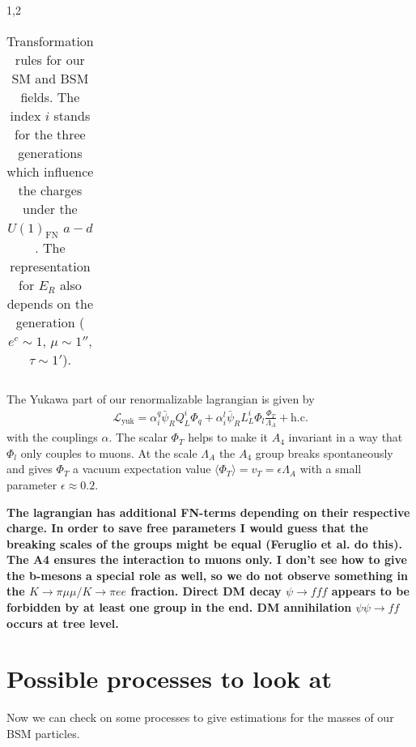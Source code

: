 \documentclass[11pt,a4paper,twoside]{article}
\begin{document}
\begin{spacing}{1,2}
\begin{table}
\begin{tabular}{c|c|c|c}
 \end{tabular}
\caption{Transformation rules for our SM and BSM fields. The index $i$ stands for the three generations which influence the charges under the 
$U(1)_\text{FN}$ $a-d$. The representation for $E_R$ also depends on the generation ($e^c \sim 1$, $\mu \sim 1''$, $\tau \sim 1'$).}
\label{tab_model}
\end{table}
The Yukawa part of our renormalizable lagrangian is given by
\begin{align}
 \mathcal{L}_\text{yuk} = \alpha^q_i \bar \psi_R Q^i_L \Phi_q + \alpha^l_i\bar \psi_R L^i_L \Phi_l \frac{\Phi_T}{\Lambda_A} + \text{h.c.}
\end{align}
with the couplings $\alpha$. The scalar $\Phi_T$ helps to make it $A_4$ invariant in a way that $\Phi_l$ only couples to muons. At the scale $\Lambda_A$ 
the $A_4$ group breaks spontaneously and gives $\Phi_T$ a vacuum expectation value $\langle \Phi_T \rangle = v_T = \epsilon \Lambda_A$ with a small parameter
$\epsilon \approx 0.2$.

\textbf{The lagrangian has additional FN-terms depending on their respective charge. In order to save free parameters I would guess that the breaking scales
of the groups might be equal (Feruglio et al. do this). The A4 ensures the interaction to muons only. I don't see how to give the b-mesons a special role
as well, so we do not observe something in the $K\rightarrow \pi \mu\mu / K \rightarrow \pi e e$ fraction. Direct DM decay $\psi\rightarrow fff$ appears to
be forbidden by at least one group in the end. DM annihilation $\psi\psi\rightarrow ff$ occurs at tree level.}


\section{Possible processes to look at}
Now we can check on some processes to give estimations for the masses of our BSM particles.

\end{spacing}
\end{document}
